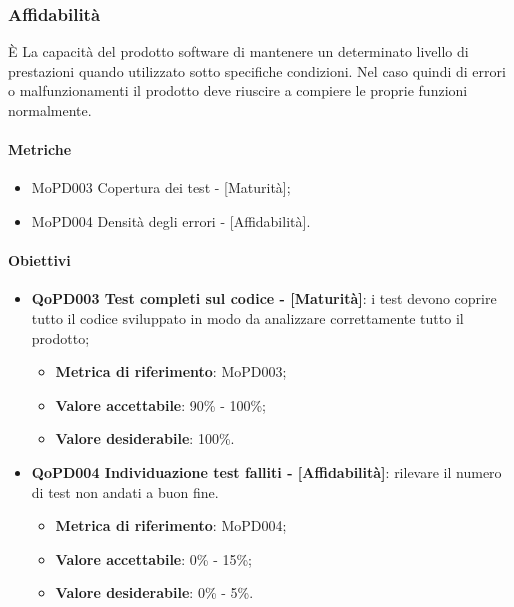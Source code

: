 \documentclass[../piano-di-qualifica.tex]{subfiles}
\begin{document}
\subsubsection{Affidabilità}%
\label{sub:affidabilita}
È La capacità del prodotto software di mantenere un determinato livello di prestazioni quando utilizzato sotto specifiche condizioni.
Nel caso quindi di errori o malfunzionamenti il prodotto deve riuscire a compiere le proprie funzioni normalmente.

\paragraph{Metriche}
\label{sub:metriche}
\begin{itemize}
    \item MoPD003 Copertura dei test - [Maturità];
    \item MoPD004 Densità degli errori - [Affidabilità].
\end{itemize}

\paragraph{Obiettivi}
\label{sub:obiettivi}
\begin{itemize}
    \item \textbf{QoPD003 Test completi sul codice - [Maturità]}: i test devono coprire tutto il codice sviluppato in modo da analizzare correttamente tutto il prodotto;
        \begin{itemize}
            \item \textbf{Metrica di riferimento}: MoPD003;
            \item \textbf{Valore accettabile}: 90\% - 100\%;
            \item \textbf{Valore desiderabile}: 100\%.
        \end{itemize}
    \item \textbf{QoPD004 Individuazione test falliti - [Affidabilità]}: rilevare il numero di test non andati a buon fine.
        \begin{itemize}
            \item \textbf{Metrica di riferimento}: MoPD004;
            \item \textbf{Valore accettabile}: 0\% - 15\%;
            \item \textbf{Valore desiderabile}: 0\% - 5\%.
        \end{itemize}
\end{itemize}
\end{document}
